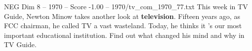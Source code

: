 \begin{textsample}{NEG Dim 8 – 1970 – Score -1.00 – 1970/tv\_com\_1970\_77.txt}  \label{ex:f8_neg_008}
This week in TV Guide, Newton Minow takes another look at \textbf{television}.
Fifteen years ago, as FCC chairman, he called TV a vast wasteland.
Today, he thinks it 's our most important educational institution.
Find out what changed his mind and why in TV Guide.

\end{textsample}
